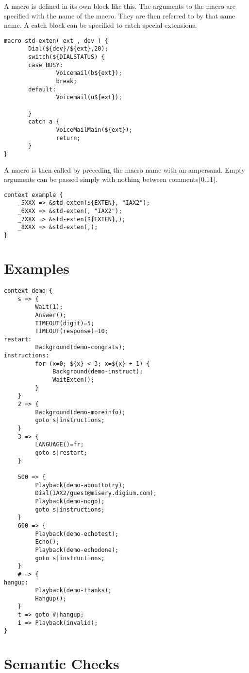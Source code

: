 {A macro is defined in its own block like this. The arguments to the
macro are specified with the name of the macro. They are then referred
to by that same name. A catch block can be specified to catch special
extensions.

\begin{verbatim}
macro std-exten( ext , dev ) {
       Dial(${dev}/${ext},20);
       switch(${DIALSTATUS) {
       case BUSY:
               Voicemail(b${ext});
               break;
       default:
               Voicemail(u${ext});

       }
       catch a {
               VoiceMailMain(${ext});
               return;
       }
}
\end{verbatim}

A macro is then called by preceding the macro name with an
ampersand. Empty arguments can be passed simply with nothing between
comments(0.11).

\begin{verbatim}
context example {
    _5XXX => &std-exten(${EXTEN}, "IAX2");
    _6XXX => &std-exten(, "IAX2");
    _7XXX => &std-exten(${EXTEN},);
    _8XXX => &std-exten(,);
}
\end{verbatim}


\section{Examples}

\begin{verbatim}
context demo {
    s => {
         Wait(1);
         Answer();
         TIMEOUT(digit)=5;
         TIMEOUT(response)=10;
restart:
         Background(demo-congrats);
instructions:
         for (x=0; ${x} < 3; x=${x} + 1) {
              Background(demo-instruct);
              WaitExten();
         }
    }
    2 => {
         Background(demo-moreinfo);
         goto s|instructions;
    }
    3 => {
         LANGUAGE()=fr;
         goto s|restart;
    }

    500 => {
         Playback(demo-abouttotry);
         Dial(IAX2/guest@misery.digium.com);
         Playback(demo-nogo);
         goto s|instructions;
    }
    600 => {
         Playback(demo-echotest);
         Echo();
         Playback(demo-echodone);
         goto s|instructions;
    }
    # => {
hangup:
         Playback(demo-thanks);
         Hangup();
    }
    t => goto #|hangup;
    i => Playback(invalid);
}
\end{verbatim}


\section{Semantic Checks}


}
